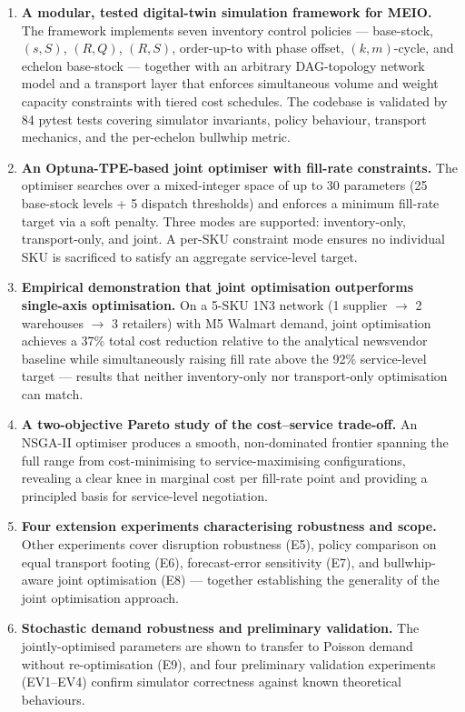 \begin{enumerate}
  \item \textbf{A modular, tested digital-twin simulation framework for
        MEIO.}  The framework implements seven inventory control policies
        --- base-stock, $(s,S)$, $(R,Q)$, $(R,S)$, order-up-to with phase
        offset, $(k,m)$-cycle, and echelon base-stock --- together with an
        arbitrary DAG-topology network model and a transport layer that
        enforces simultaneous volume and weight capacity constraints with
        tiered cost schedules.  The codebase is validated by 84 pytest
        tests covering simulator invariants, policy behaviour, transport
        mechanics, and the per-echelon bullwhip metric.

  \item \textbf{An Optuna-TPE-based joint optimiser with fill-rate
        constraints.}  The optimiser searches over a mixed-integer space
        of up to 30 parameters (25 base-stock levels + 5 dispatch
        thresholds) and enforces a minimum fill-rate target via a soft
        penalty.  Three modes are supported: inventory-only, transport-only,
        and joint.  A per-SKU constraint mode ensures no individual SKU is
        sacrificed to satisfy an aggregate service-level target.

  \item \textbf{Empirical demonstration that joint optimisation
        outperforms single-axis optimisation.}  On a 5-SKU 1N3 network
        (1 supplier $\to$ 2 warehouses $\to$ 3 retailers) with M5 Walmart
        demand, joint optimisation achieves a 37\% total cost reduction
        relative to the analytical newsvendor baseline while simultaneously
        raising fill rate above the 92\% service-level target --- results
        that neither inventory-only nor transport-only optimisation can match.

  \item \textbf{A two-objective Pareto study of the cost--service
        trade-off.}  An NSGA-II optimiser produces a smooth, non-dominated
        frontier spanning the full range from cost-minimising to
        service-maximising configurations, revealing a clear knee in
        marginal cost per fill-rate point and providing a principled basis
        for service-level negotiation.

  \item \textbf{Four extension experiments characterising robustness and
        scope.}  Other experiments cover disruption
        robustness (E5), policy comparison on equal transport footing (E6),
        forecast-error sensitivity (E7), and bullwhip-aware joint
        optimisation (E8) --- together establishing the generality of the
        joint optimisation approach.

  \item \textbf{Stochastic demand robustness and preliminary validation.}
        The jointly-optimised parameters are shown to transfer to Poisson
        demand without re-optimisation (E9), and four preliminary
        validation experiments (EV1--EV4) confirm simulator correctness
        against known theoretical behaviours.
\end{enumerate}

